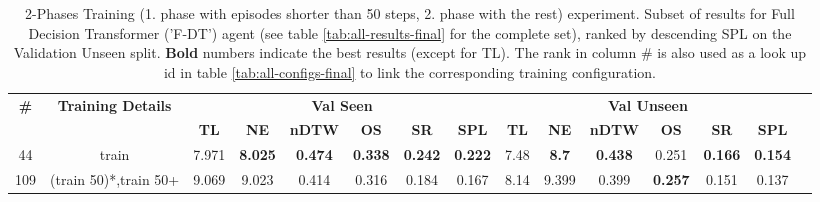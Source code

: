 \begin{table}
\centering
\caption{\label{tab:f_dt_split_training_50}2-Phases Training (1. phase with episodes shorter than 50 steps, 2. phase with the rest) experiment. Subset of results for Full Decision Transformer ('F-DT') agent (see table \ref{tab:all-results-final} for the complete set), ranked by descending SPL on the Validation Unseen split. \textbf{Bold} numbers indicate the best results (except for TL). The rank in column \# is also used as a look up id in table \ref{tab:all-configs-final} to link the corresponding training configuration.}
\begin{tabular}{@{\hskip3pt}c@{\hskip3pt}c@{\hskip3pt}c@{\hskip3pt}c@{\hskip3pt}c@{\hskip3pt}c@{\hskip3pt}c@{\hskip3pt}c@{\hskip3pt}c@{\hskip3pt}c@{\hskip3pt}c@{\hskip3pt}c@{\hskip3pt}c@{\hskip3pt}c@{\hskip3pt}c}
\toprule
                                  \textbf{\#} & \textbf{Training Details} & \multicolumn{6}{c}{\textbf{Val Seen}} & \multicolumn{6}{c}{\textbf{Val Unseen}} \\
\cmidrule(l){3-8}\cmidrule(l){9-14}\textbf{~} &                \textbf{~} &       \textbf{TL} &     \textbf{NE} &   \textbf{nDTW} &     \textbf{OS} &     \textbf{SR} &    \textbf{SPL} &         \textbf{TL} &   \textbf{NE} &   \textbf{nDTW} &     \textbf{OS} &     \textbf{SR} &    \textbf{SPL} \\
\midrule
                                           44 &                     train &             7.971 &  \textbf{8.025} &  \textbf{0.474} &  \textbf{0.338} &  \textbf{0.242} &  \textbf{0.222} &                7.48 &  \textbf{8.7} &  \textbf{0.438} &           0.251 &  \textbf{0.166} &  \textbf{0.154} \\
                                          109 &     (train 50)*,train 50+ &             9.069 &           9.023 &           0.414 &           0.316 &           0.184 &           0.167 &                8.14 &         9.399 &           0.399 &  \textbf{0.257} &           0.151 &           0.137 \\
\bottomrule
\end{tabular}
\end{table}
